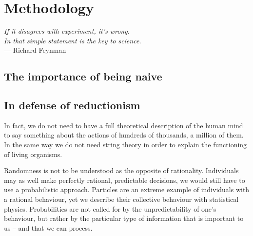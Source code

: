

\chapter{Methodology}
\label{chap:methodology}

\begin{flushright}{\slshape    
If it disagrees with experiment, it's wrong.\\ 
In that simple statement is the key to science.} \\ \medskip
--- Richard Feynman~\cite{Feynman:1965}
\end{flushright}

\bigskip

\section{The importance of being naive}
\label{sec:the_importance_of_being_naive}

\section{In defense of reductionism}
\label{sec:in_defense_of_reductionism}

In fact, we do not need to have a full theoretical description of the human mind
to say something about the actions of hundreds of thousands, a million of them.
In the same way we do not need string theory in order to explain the
functioning of living organisms.

Randomness is not to be understood as the opposite of rationality. Individuals
may as well make perfectly rational, predictable decisions, we would still have
to use a probabilistic approach. Particles are an extreme example of individuals
with a rational behaviour, yet we describe their collective behaviour with
statistical physics. Probabilities are not called for by the unpredictability of
one's behaviour, but rather by the particular type of information that is
important to us -- and that we can process.

